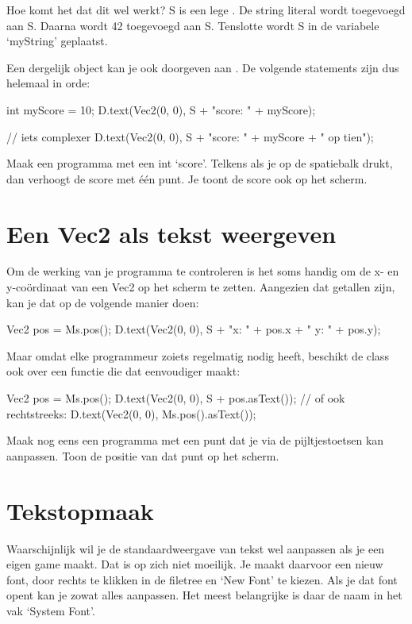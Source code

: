 Hoe komt het dat dit wel werkt? S is een lege . De string literal wordt toegevoegd aan S. Daarna wordt 42 toegevoegd aan S. Tenslotte wordt S in de variabele `myString' geplaatst.

Een dergelijk object kan je ook doorgeven aan . De volgende statements zijn dus helemaal in orde:

\begin{code}
int myScore = 10;
D.text(Vec2(0, 0), S + "score: " + myScore);

// iets complexer
D.text(Vec2(0, 0), S + "score: " + myScore + " op tien");
\end{code}

\begin{exercise}
Maak een programma met een int `score'. Telkens als je op de spatiebalk drukt, dan verhoogt de score met \'e\'en punt. Je toont de score ook op het scherm.
\end{exercise}

\section{Een Vec2 als tekst weergeven}
Om de werking van je programma te controleren is het soms handig om de x- en y-co\"ordinaat van een Vec2 op het scherm te zetten. Aangezien dat getallen zijn, kan je dat op de volgende manier doen:

\begin{code}
Vec2 pos = Ms.pos();
D.text(Vec2(0, 0), S + "x: " + pos.x + " y: " + pos.y);
\end{code}

Maar omdat elke programmeur zoiets regelmatig nodig heeft, beschikt de class  ook over een functie die dat eenvoudiger maakt:

\begin{code}
Vec2 pos = Ms.pos();
D.text(Vec2(0, 0), S + pos.asText());
// of ook rechtstreeks:
D.text(Vec2(0, 0), Ms.pos().asText());
\end{code}

\begin{exercise}
Maak nog eens een programma met een punt dat je via de pijltjestoetsen kan aanpassen. Toon de positie van dat punt op het scherm.
\end{exercise}

\section{Tekstopmaak}
\label{chapter:tekstopmaak}
Waarschijnlijk wil je de standaardweergave van tekst wel aanpassen als je een eigen game maakt. Dat is op zich niet moeilijk. Je maakt daarvoor een nieuw font, door rechts te klikken in de filetree en `New Font' te kiezen. Als je dat font opent kan je zowat alles aanpassen. Het meest belangrijke is daar de naam in het vak `System Font'.

